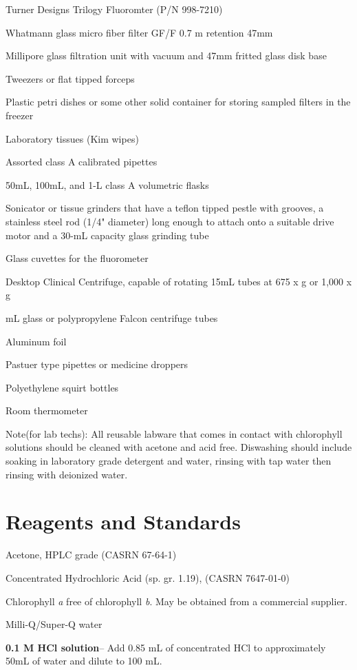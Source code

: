 \documentclass[12pt]{../SOP3_alpha}
\begin{document}
\NP Turner Designs Trilogy Fluoromter (P/N 998-7210)

\NP Whatmann glass micro fiber filter GF/F 0.7 \micro m retention 47mm 

\NP Millipore glass filtration unit with vacuum and 47mm fritted glass disk base 

\NP Tweezers or flat tipped forceps

\NP Plastic petri dishes or some other solid container for storing sampled filters in the freezer

\NP Laboratory tissues (Kim wipes)

\NP Assorted class A calibrated pipettes 

\NP 50mL, 100mL, and 1-L class A volumetric flasks

\NP Sonicator or tissue grinders that have a teflon tipped pestle with grooves, a stainless steel rod (1/4" diameter) long enough to attach onto a suitable drive motor and a 30-mL capacity glass grinding tube

\NP Glass cuvettes for the fluorometer

\NP Desktop Clinical Centrifuge, capable of rotating 15mL tubes at 675 x g or 1,000 x g 

 mL glass or polypropylene Falcon centrifuge tubes

\NP Aluminum foil

\NP Pastuer type pipettes or medicine droppers

\NP Polyethylene squirt bottles

\NP Room thermometer

\NP Note(for lab techs): All reusable labware that comes in contact with chlorophyll solutions should be cleaned with acetone and acid free. Diswashing should include soaking in laboratory grade detergent and water, rinsing with tap water then rinsing with deionized water. 

\section{Reagents and Standards}
\NP Acetone, HPLC grade (CASRN 67-64-1)

\NP Concentrated Hydrochloric Acid (sp. gr. 1.19), (CASRN 7647-01-0)

\NP Chlorophyll \textit{a} free of chlorophyll \textit{b}. May be obtained from a commercial supplier.

\NP Milli-Q/Super-Q water

\NP \textbf{0.1 M HCl solution}-- Add 0.85 mL of concentrated HCl to approximately 50mL of water and dilute to 100 mL. 
\end{document}
